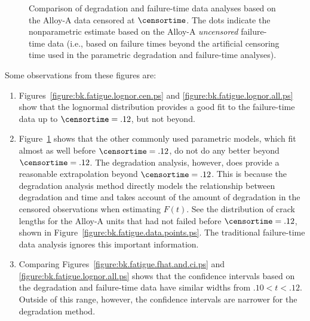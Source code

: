 \begin{figure}
\caption{Comparison of degradation and failure-time
data analyses based on the Alloy-A data censored at $\censortime$.
The dots indicate the nonparametric estimate based on the Alloy-A
{\em uncensored} failure-time data (i.e., based on failure times
beyond the artificial censoring time used in the parametric
degradation and failure-time analyses).}
\label{figure:bk.fatigue.dist.comp.ps}
\end{figure}
Some observations from these figures are:
\begin{enumerate}
\item
Figures~\ref{figure:bk.fatigue.lognor.cen.ps} and
\ref{figure:bk.fatigue.lognor.all.ps} show that the lognormal
distribution provides a good fit to the failure-time data up to
$\censortime=.12$, but not beyond.
\item
Figure~\ref{figure:bk.fatigue.dist.comp.ps} shows that the other
commonly used parametric models, which fit almost as well before
$\censortime=.12$, do not do any better beyond $\censortime=.12$.
The degradation analysis, however, does provide a reasonable
extrapolation beyond $\censortime=.12$.  This is because the
degradation analysis method directly models the relationship between
degradation and time and takes account of the amount of degradation
in the censored observations when estimating $F(t)$.  See the
distribution of crack lengths for the Alloy-A units that had not
failed before $\censortime=.12$, shown in
Figure~\ref{figure:bk.fatigue.data.points.ps}.  The traditional
failure-time data analysis ignores this important information.

\item
Comparing Figures~\ref{figure:bk.fatigue.fhat.and.ci.ps} and
\ref{figure:bk.fatigue.lognor.all.ps} shows that the confidence
intervals based on the degradation and failure-time data have
similar widths from $.10 < t < .12$.  Outside of this range, however,
the confidence intervals are narrower for the degradation method.
\end{enumerate}

